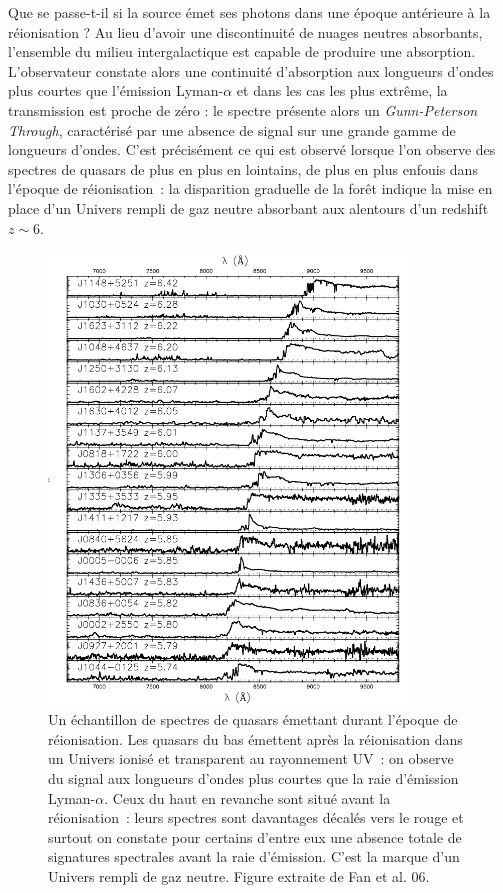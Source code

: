 Que se passe-t-il si la source émet ses photons dans une époque antérieure à la réionisation ? Au lieu d'avoir une discontinuité de nuages neutres absorbants, l'ensemble du milieu intergalactique est capable de produire une absorption. L'observateur constate alors une continuité d'absorption aux longueurs d'ondes plus courtes que l'émission Lyman-$\alpha$ et dans les cas les plus extrême, la transmission est proche de zéro : le spectre présente alors un \textit{Gunn-Peterson Through}, caractérisé par une absence de signal sur une grande gamme de longueurs d'ondes. C'est précisément ce qui est observé lorsque l'on observe des spectres de quasars de plus en plus en lointains, de plus en plus enfouis dans l'époque de réionisation~: la disparition graduelle de la forêt indique la mise en place d'un Univers rempli de gaz neutre absorbant aux alentours d'un redshift $z\sim 6$.
\begin{figure}[htbp]
	\centering
		\includegraphics[height=12cm]{figs/fan06.png}
		\caption[Spectres de quasars durant la réionisation]{Un échantillon de spectres de quasars émettant durant l'époque de réionisation. Les quasars du bas émettent après la réionisation dans un Univers ionisé et transparent au rayonnement UV~: on observe du signal aux longueurs d'ondes plus courtes que la raie d'émission Lyman-$\alpha$. Ceux du haut en revanche sont situé avant la réionisation~: leurs spectres sont davantages décalés vers le rouge et surtout on constate pour certains d'entre eux une absence totale de signatures spectrales avant la raie d'émission. C'est la marque d'un Univers rempli de gaz neutre. Figure extraite de Fan et al. 06.}
	\label{f:fan06}
\end{figure}

